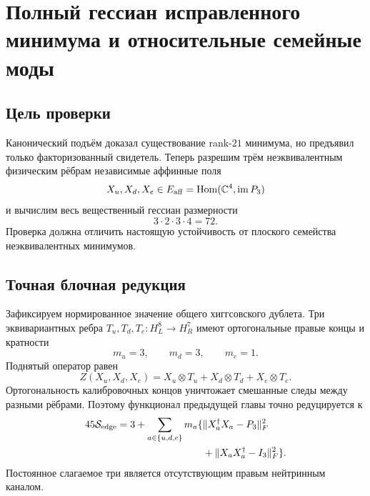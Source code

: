 \chapter{Полный гессиан исправленного минимума и относительные семейные моды}

\section{Цель проверки}

Канонический подъём доказал существование rank-$21$ минимума, но предъявил
только факторизованный свидетель. Теперь разрешим трём неэквивалентным
физическим рёбрам независимые аффинные поля
\begin{equation}
 X_u,X_d,X_e\in
 E_{\rm aff}=\operatorname{Hom}(\mathbb C^4,\operatorname{im}P_3)
 \label{eq:v7-three-independent-affine-edges}
\end{equation}
и вычислим весь вещественный гессиан размерности
\begin{equation}
 3\cdot2\cdot3\cdot4=72.
\end{equation}
Проверка должна отличить настоящую устойчивость от плоского семейства
неэквивалентных минимумов.

\section{Точная блочная редукция}

Зафиксируем нормированное значение общего хиггсовского дублета. Три
эквивариантных ребра $T_u,T_d,T_e:H_L^8\to H_R^7$ имеют ортогональные
правые концы и кратности
\begin{equation}
 m_u=3,
 \qquad
 m_d=3,
 \qquad
 m_e=1.
\end{equation}
Поднятый оператор равен
\begin{equation}
 Z(X_u,X_d,X_e)
 =X_u\otimes T_u+X_d\otimes T_d+X_e\otimes T_e.
 \label{eq:v7-three-edge-lifted-operator}
\end{equation}
Ортогональность калибровочных концов уничтожает смешанные следы между
разными рёбрами. Поэтому функционал предыдущей главы точно редуцируется к
\begin{equation}
 \begin{split}
 45\mathcal S_{\rm edge}
 =3+\sum_{a\in\{u,d,e\}}m_a\{&
 \|X_a^\dagger X_a-P_3\|_F^2\\
 &+\|X_aX_a^\dagger-I_3\|_F^2\}.
 \end{split}
 \label{eq:v7-relative-edge-action}
\end{equation}
Постоянное слагаемое три является отсутствующим правым нейтринным каналом.


